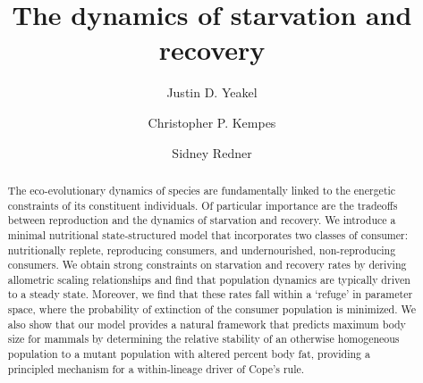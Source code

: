 \documentclass[twocolumn,preprintnumbers,amsmath,amssymb,superscriptaddress]{revtex4}
\begin{document}
\author{Justin D. Yeakel} 

\author{Christopher P. Kempes} 

\author{Sidney Redner} 

\title{The dynamics of starvation and recovery}%


\begin{abstract} %
The eco-evolutionary dynamics of species are fundamentally linked to the energetic constraints of its constituent individuals. 
Of particular importance are the tradeoffs between reproduction and the dynamics of starvation and recovery. %
We introduce a minimal nutritional state-structured model that incorporates two classes of consumer: nutritionally replete, reproducing consumers, and undernourished, non-reproducing consumers. %
We obtain strong constraints on starvation and recovery rates by deriving allometric scaling relationships and find that population dynamics are typically driven to a steady state. %
Moreover, we find that these rates fall within a `refuge' in parameter space, where the probability of extinction of the consumer population is minimized. 
We also show that our model provides a natural framework that predicts maximum body size for mammals by determining the relative stability of an otherwise homogeneous population to a mutant population with altered percent body fat, providing a principled mechanism for a within-lineage driver of Cope's rule.
\end{abstract}
\end{document}
